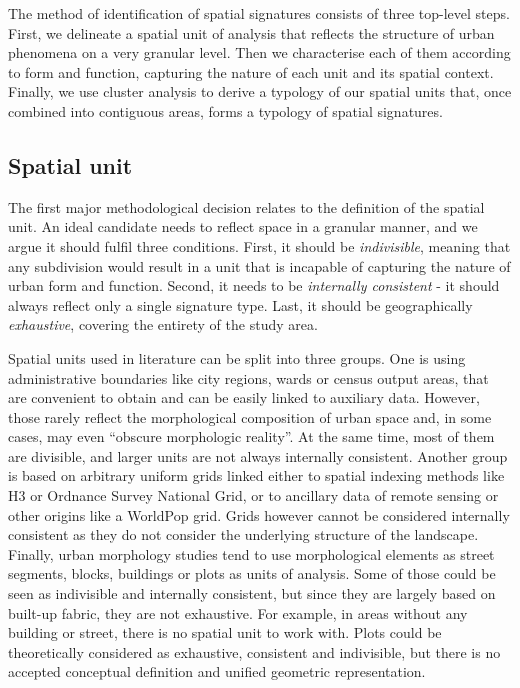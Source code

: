 The method of identification of spatial signatures consists of three top-level steps.
First, we delineate a spatial unit of analysis that reflects the structure of
urban phenomena on a very granular level. Then we characterise each of them
according to form and function, capturing the nature of each unit and its spatial
context. Finally, we use cluster analysis to derive a typology of our spatial units
that, once combined into contiguous areas, forms a typology of spatial signatures.

\subsection*{Spatial unit}
The first major methodological decision relates to the definition of the
spatial unit. An ideal candidate needs to reflect space in a granular manner, and we argue
it should fulfil three conditions. First, it should be \textit{indivisible},
meaning that any subdivision would result in a unit that is incapable of
capturing the nature of urban form and function. Second, it needs to be
\textit{internally consistent} - it should always reflect only a single signature type.
Last, it should be geographically \textit{exhaustive}, covering the entirety of the study
area.

Spatial units used in literature can be split into three groups. One is using
administrative boundaries like city regions\cite{angel2020}, wards or census output areas\cite{alexiou2016}, that are
convenient to obtain and can be easily linked to auxiliary data. However,
those rarely reflect the morphological composition of urban space and, in some cases, may
even “obscure morphologic reality”\cite{taubenbock2019new}. At the same time, most of them
are divisible, and larger units are not always internally consistent. Another group is based on
arbitrary uniform grids linked either to spatial indexing methods like
H3\cite{brodsky2018h3} or Ordnance Survey
National Grid, or to ancillary data of remote sensing or other origins like a
WorldPop grid\cite{jochem2021tools}. Grids however cannot be considered internally 
consistent as
they do not consider the underlying structure of the landscape.
Finally, urban morphology studies tend to use morphological elements as
street segments\cite{araldi2019}, blocks\cite{gil2012},
buildings\cite{hamaina2012a} or plots\cite{bobkova2019} as units of analysis.
Some of those
could be seen as indivisible and internally consistent, but since they are largely based
on built-up fabric, they are not exhaustive. For example, in areas without any building or
street, there
is no spatial unit to work with. Plots could be theoretically considered as exhaustive,
consistent and indivisible, but there is no accepted conceptual definition and unified
geometric representation\cite{kropf2018}.

